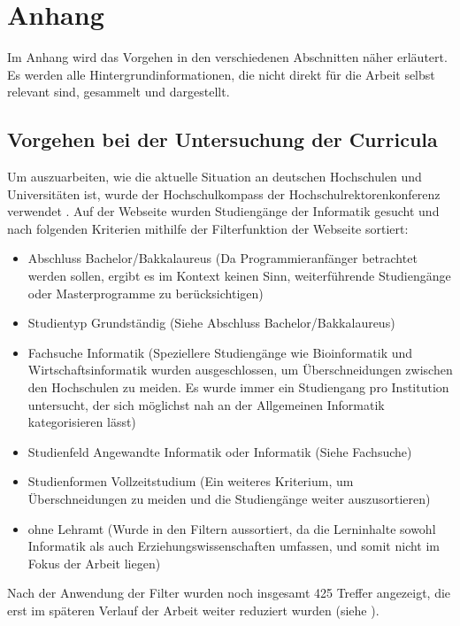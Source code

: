 \clearpage
\section{Anhang}
\label{sec:appendix}

Im Anhang wird das Vorgehen in den verschiedenen Abschnitten näher erläutert. Es werden alle Hintergrundinformationen, die nicht direkt für die Arbeit selbst relevant sind, gesammelt und dargestellt.

\subsection{Vorgehen bei der Untersuchung der Curricula}
Um auszuarbeiten, wie die aktuelle Situation an deutschen Hochschulen und Universitäten ist, wurde der Hochschulkompass der Hochschulrektorenkonferenz verwendet \cite{hochschulkompass}.
Auf der Webseite wurden Studiengänge der Informatik gesucht und nach folgenden Kriterien mithilfe der Filterfunktion der Webseite sortiert:

\begin{itemize}
    \item Abschluss Bachelor/Bakkalaureus (Da Programmieranfänger betrachtet werden sollen, ergibt es im Kontext keinen Sinn, weiterführende Studiengänge oder Masterprogramme zu berücksichtigen)
    \item Studientyp Grundständig (Siehe Abschluss Bachelor/Bakkalaureus)
    \item Fachsuche Informatik (Speziellere Studiengänge wie Bioinformatik und Wirtschaftsinformatik wurden ausgeschlossen, um Überschneidungen zwischen den Hochschulen zu meiden. Es wurde immer ein Studiengang pro Institution untersucht, der sich möglichst nah an der Allgemeinen Informatik kategorisieren lässt)
    \item Studienfeld Angewandte Informatik oder Informatik (Siehe Fachsuche)
    \item Studienformen Vollzeitstudium (Ein weiteres Kriterium, um Überschneidungen zu meiden und die Studiengänge weiter auszusortieren)
    \item ohne Lehramt (Wurde in den Filtern aussortiert, da die Lerninhalte sowohl Informatik als auch Erziehungswissenschaften umfassen, und somit nicht im Fokus der Arbeit liegen)
\end{itemize}

Nach der Anwendung der Filter wurden noch insgesamt 425 Treffer angezeigt, die erst im späteren Verlauf der Arbeit weiter reduziert wurden (siehe ).

